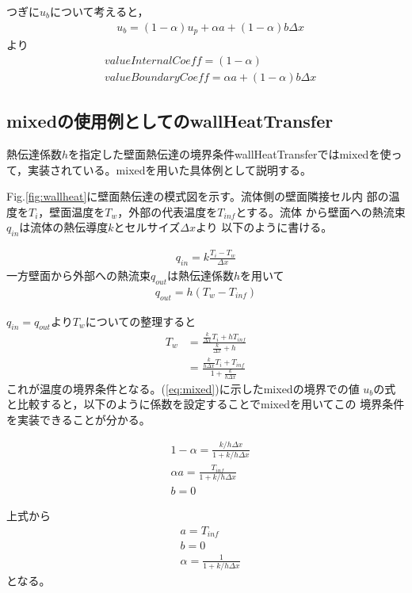 \documentclass[a4paper,fleqn]{jsarticle}
\begin{document}
つぎに$u_b$について考えると，
\begin{align}
& u_b=(1-\alpha)u_p+\alpha a +(1-\alpha)b\Delta x
\end{align}
より
\begin{align}
& valueInternalCoeff=(1-\alpha) \\
& valueBoundaryCoeff=\alpha a +(1-\alpha)b\Delta x
\end{align}

\subsection{mixedの使用例としてのwallHeatTransfer}
熱伝達係数$h$を指定した壁面熱伝達の境界条件wallHeatTransferではmixedを使っ
て，実装されている。mixedを用いた具体例として説明する。

Fig.\ref{fig:wallheat}に壁面熱伝達の模式図を示す。流体側の壁面隣接セル内
部の温度を$T_i$，壁面温度を$T_w$，外部の代表温度を$T_{inf}$とする。流体
から壁面への熱流束$q_{in}$は流体の熱伝導度$k$とセルサイズ$\Delta x$より
以下のように書ける。

\begin{align}
q_{in}=k\frac{T_i-T_w}{\Delta x} 
\end{align}
一方壁面から外部への熱流束$q_{out}$は熱伝達係数$h$を用いて
\begin{align}
 q_{out}=h(T_w-T_{inf})
\end{align}

$q_{in}=q_{out}$より$T_w$についての整理すると
\begin{align}
 T_w&=\frac{\frac{k}{\Delta x}T_i+h T_{inf}}{\frac{k}{\Delta x}+h} \\
 &=\frac{\frac{k}{h\Delta x}T_i+T_{inf}}{1+\frac{k}{h\Delta x}}
\end{align}
%
これが温度の境界条件となる。(\ref{eq:mixed})に示したmixedの境界での値
$u_b$の式と比較すると，以下のように係数を設定することでmixedを用いてこの
境界条件を実装できることが分かる。

\begin{align}
 & 1-\alpha=\frac{k/h\Delta x}{1+k/h\Delta x} \\
 &\alpha a=\frac{T_{inf}}{1+k/h\Delta x}\\
 &b=0 
\end{align}

上式から
\begin{align}
 & a=T_{inf} \label{eq:a} \\
 &b=0 \label{eq:b} \\
 &\alpha=\frac{1}{1+k/h\Delta x} \label{eq:alpha}
\end{align}
となる。
\end{document}
